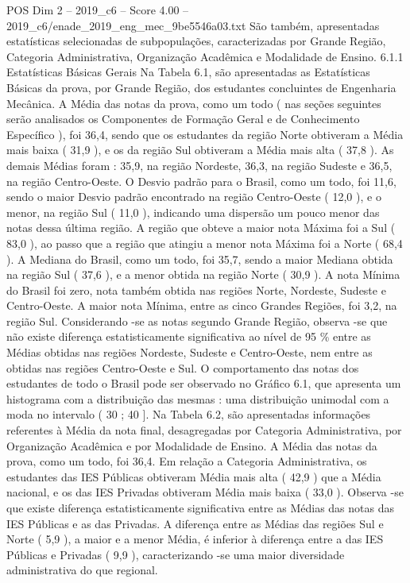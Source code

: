 \begin{textsample}{POS Dim 2 – 2019\_c6 – Score 4.00 – 2019\_c6/enade\_2019\_eng\_mec\_9be5546a03.txt}
São também, apresentadas estatísticas selecionadas de subpopulações, caracterizadas por Grande Região, Categoria Administrativa, Organização Acadêmica e Modalidade de Ensino. 6.1.1 Estatísticas Básicas Gerais Na Tabela 6.1, são apresentadas as Estatísticas Básicas da prova, por Grande Região, dos estudantes concluintes de Engenharia Mecânica.
A Média das notas da prova, como um todo ( nas seções seguintes serão analisados os Componentes de Formação Geral e de Conhecimento Específico ), foi 36,4, sendo que os estudantes da região Norte obtiveram a Média mais baixa ( 31,9 ), e os da região Sul obtiveram a Média mais alta ( 37,8 ).
As demais Médias foram : 35,9, na região Nordeste, 36,3, na região Sudeste e 36,5, na região Centro-Oeste.
O Desvio padrão para o Brasil, como um todo, foi 11,6, sendo o maior Desvio padrão encontrado na região Centro-Oeste ( 12,0 ), e o menor, na região Sul ( 11,0 ), indicando uma dispersão um pouco menor das notas dessa última região.
A região que obteve a maior nota Máxima foi a Sul ( 83,0 ), ao passo que a região que atingiu a menor nota Máxima foi a Norte ( 68,4 ).
A Mediana do Brasil, como um todo, foi 35,7, sendo a maior Mediana obtida na região Sul ( 37,6 ), e a menor obtida na região Norte ( 30,9 ).
A nota Mínima do Brasil foi zero, nota também obtida nas regiões Norte, Nordeste, Sudeste e Centro-Oeste.
A maior nota Mínima, entre as cinco Grandes Regiões, foi 3,2, na região Sul.
Considerando -se as notas segundo Grande Região, observa -se que não existe diferença estatisticamente significativa ao nível de 95 \% entre as Médias obtidas nas regiões Nordeste, Sudeste e Centro-Oeste, nem entre as obtidas nas regiões Centro-Oeste e Sul.
O comportamento das notas dos estudantes de todo o Brasil pode ser observado no Gráfico 6.1, que apresenta um histograma com a distribuição das mesmas : uma distribuição unimodal com a moda no intervalo ( 30 ; 40 ].
Na Tabela 6.2, são apresentadas informações referentes à Média da nota final, desagregadas por Categoria Administrativa, por Organização Acadêmica e por Modalidade de Ensino.
A Média das notas da prova, como um todo, foi 36,4.
Em relação a Categoria Administrativa, os estudantes das IES Públicas obtiveram Média mais alta ( 42,9 ) que a Média nacional, e os das IES Privadas obtiveram Média mais baixa ( 33,0 ).
Observa -se que existe diferença estatisticamente significativa entre as Médias das notas das IES Públicas e as das Privadas.
A diferença entre as Médias das regiões Sul e Norte ( 5,9 ), a maior e a menor Média, é inferior à diferença entre a das IES Públicas e Privadas ( 9,9 ), caracterizando -se uma maior diversidade administrativa do que regional.

\end{textsample}
